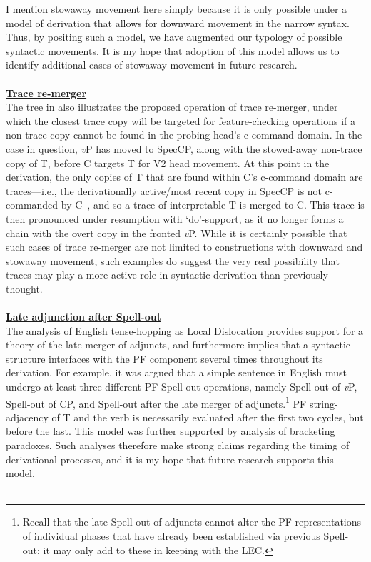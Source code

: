 I mention stowaway movement here simply because it is only possible under a model of derivation that allows for downward movement in the narrow syntax. Thus, by positing such a model, we have augmented our typology of possible syntactic movements. It is my hope that adoption of this model allows us to identify additional cases of stowaway movement in future research.\\\\
\underline{\textbf{Trace re-merger}}\\The tree in \Last also illustrates the proposed operation of trace re-merger, under which the closest trace copy will be targeted for feature-checking operations if a non-trace copy cannot be found in the probing head's c-command domain. In the case in question, {\it v}P has moved to SpecCP, along with the stowed-away non-trace copy of T, before C targets T for V2 head movement. At this point in the derivation, the only copies of T that are found within C's c-command domain are traces---i.e., the derivationally active/most recent copy in SpecCP is not c-commanded by C--, and so a trace of interpretable T is merged to C\raisebox{-3pt}{\small{\sc{[-t]}}}. This trace is then pronounced under resumption with `do'-support, as it no longer forms a chain with the overt copy in the fronted {\it v}P. While it is certainly possible that such cases of trace re-merger are not limited to constructions with downward and stowaway movement, such examples do suggest the very real possibility that traces may play a more active role in syntactic derivation than previously thought.\\\\
\underline{\textbf{Late adjunction after Spell-out}}\\The analysis of English tense-hopping as Local Dislocation provides support for a theory of the late merger of adjuncts, and furthermore implies that a syntactic structure interfaces with the PF component several times throughout its derivation. For example, it was argued that a simple sentence in English must undergo at least three different PF Spell-out operations, namely Spell-out of {\it v}P, Spell-out of CP, and Spell-out after the late merger of adjuncts.\footnote{Recall that the late Spell-out of adjuncts cannot alter the PF representations of individual phases that have already been established via previous Spell-out; it may only add to these in keeping with the LEC.} PF string-adjacency of T and the verb is necessarily evaluated after the first two cycles, but before the last. This model was further supported by  analysis of bracketing paradoxes. Such analyses therefore make strong claims regarding the timing of derivational processes, and it is my hope that future research supports this model.\\\\
